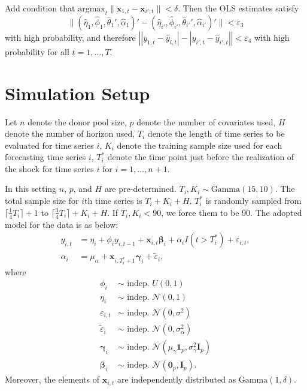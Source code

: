 \documentclass[11pt]{article}
\newcommand{\x}{\textbf{x}}
\def\mbf#1{\mathbf{#1}} %
\def\mrm#1{\mathrm{#1}} %
\def\mc#1{\mathcal{#1}} %
\def\mc#1{\mathcal{#1}}
\def\bs#1{\boldsymbol{#1}}
\newcommand{\ceil}[1]{\lceil #1 \rceil}
\theoremstyle{definition}
\begin{document}
\vspace*{0.5cm}
Add condition that $\text{argmax}_t\|\x_{1,t} - \x_{i',t}\| < \delta$. Then the OLS estimates satisfy 
$$
  \|(\hat\eta_1,\hat\phi_1,\hat\theta_1',\hat\alpha_1)' - 
    (\hat\eta_{i'},\hat\phi_{i'},\hat\theta_{i'}',\hat\alpha_{i'})'\| < \varepsilon_3
$$
with high probability, and therefore $\left\vert|y_{1,t} - \hat y_{i,t}| - |y_{i',t} - \hat y_{i',t}|\right\vert < \varepsilon_4$ with high probability for all $t = 1,\ldots,T$.






\section{Simulation Setup}
\label{simulation}

Let $n$ denote the donor pool size, $p$ denote the number of covariates used, $H$ denote the number of horizon used, $T_i$ denote the length of time series to be evaluated for time series $i$, $K_i$ denote the training sample size used for each  forecasting  time series $i$, $T_i^*$ denote the time point just before the realization of the shock for time series $i$ for $i = 1, \ldots, n+1$.


In this setting $n$, $p$, and $H$ are pre-determined. $T_i, K_i \sim \mrm{Gamma}(15, 10)$.  The total sample size for $i$th time series is $T_i + K_i + H$. $T_i^*$ is randomly sampled from $\ceil{\frac{1}{4}T_i}+1$ to $\ceil{\frac{3}{4} T_i} + K_i+ H$. If $T_i, K_i < 90$, we force them to be 90. The adopted model for the data is as below:
\begin{align*}
  y_{i,t} &= \eta_i + \phi_i y_{i,t-1} + \mbf{x}_{i,t} \bs{\beta}_i + \alpha_i I(t > T_i^*) + \varepsilon_{i,t},\\
  \alpha_i &= \mu_{\alpha} + \mbf{x}_{i,T_i^*+1}\bs{\gamma}_i + \tilde{\varepsilon}_{i},
\end{align*}
where
\begin{align*}
  \phi_i & \sim \text{ indep. }  U(0,1) \\
  \eta_i & \sim \text{ indep. }  \mc{N}(0,1) \\
  \varepsilon_{i,t} & \sim \text{ indep. } \mc{N}(0, \sigma^2)\\
  \tilde{\varepsilon}_i & \sim \text{ indep. } \mc{N}(0, \sigma_{\alpha}^2)
  \\
  \bs{\gamma}_i & \sim \text{ indep. } \mc{N}(\mu_{\gamma}\bs{1}_p, \sigma_{\gamma}^2 \mbf{I}_p) \\
  \bs{\beta}_i & \sim \text{ indep. }  \mc{N}(\bs{0}_p, \mbf{I}_p).
\end{align*}
Moreover, the elements of $\mathbf{x}_{i,t}$ are independently distributed as $\mrm{Gamma}(1,\delta)$.
\end{document}
